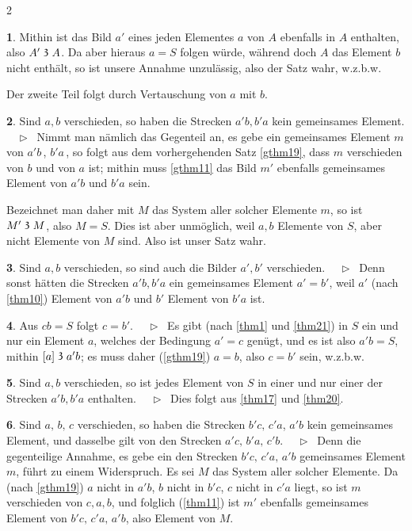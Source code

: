 \documentclass[leqno,hidelinks,10pt]{article}
\theoremstyle{definition}
\newtheorem{satz}{\protect\satzname}
\newcommand{\satzname}{}
\renewcommand{\satzname}{\hspace{-4pt}.\ Satz}%
\renewcommand{\satzname}{\hspace{-4pt}.\ Theorem}%
\newcommand\Beweis{\medskip \newline $ \phantom{'.'} \rhd \ $}%
\newcommand\TeilVon{\mathrel{\raisebox{0.45ex}{$\mathfrak{3}$}}}
\newcommand{\sref}[1]{\underline{\ref{#1}}}%
\begin{document}
\begin{paracol}{2}
\begin{leftcolumn}
\begin{satz}
Mithin ist das Bild $a'$ eines jeden Elementes $a$ von $A$ ebenfalls in $A$
enthalten, also $A' \TeilVon A$. Da aber hieraus $a = S$ folgen würde, während
doch $A$ das Element $b$ nicht enthält, so ist unsere Annahme unzulässig, also
der Satz wahr, w.z.b.w.

Der zweite Teil folgt durch Vertauschung von $a$ mit $b$.%
\end{satz}

\begin{satz}\label{gthm20}
Sind $a, b$ verschieden, so haben die Strecken $a'b, b'a$ kein gemeinsames
Element.
\Beweis
Nimmt man nämlich das Gegenteil an, es gebe ein gemeinsames Element
$m\,$ von $a'b\,$, $b'a\,$, so folgt aus dem vorhergehenden Satz
\sref{gthm19}, dass $m$ verschieden von $b$ und von $a$ ist; mithin muss
\sref{gthm11} das Bild $m'$ ebenfalls gemeinsames Element von $a'b$ und $b'a$ sein.

Bezeichnet man daher mit $M$ das System aller solcher Elemente $m$, so ist
$M' \TeilVon M$, also $M = S$. Dies ist aber unmöglich, weil $a, b$ Elemente von
$S$, aber nicht Elemente von $M$ sind. Also ist unser Satz wahr.
\end{satz}

\begin{satz}\label{gthm21}
Sind $a, b$ verschieden, so sind auch die Bilder $a', b'$ verschieden.
\Beweis
Denn sonst hätten die Strecken $a'b, b'a$ ein gemeinsames Element $a' = b'$, weil
$a'$ (nach \sref{thm10}) Element von $a'b$ und $b'$ Element von $b'a$ ist.
\end{satz}

\begin{satz}\label{gthm22}
Aus $cb = S$ folgt $c = b'$.
\Beweis
Es gibt (nach \sref{thm1} und \sref{thm21}) in $S$ ein und nur ein Element $a$,
welches der Bedingung $a' = c$ genügt, und es ist also $a'b = S$, mithin
$[a] \TeilVon a'b$; es muss daher (\sref{gthm19}) $a = b$, also $c = b'$ sein, w.z.b.w.
\end{satz}

\begin{satz}\label{gthm23}
Sind $a, b$ verschieden, so ist jedes Element von $S$ in einer und nur einer
der Strecken $a'b, b'a$ enthalten.
\Beweis
Dies folgt aus \sref{thm17} und \sref{thm20}.
\end{satz}

\begin{satz}\label{gthm24}
Sind $a,\, b,\, c$ verschieden, so haben die Strecken $b'c,\, c'a$, $a'b$ kein
gemeinsames Element, und dasselbe gilt von den Strecken $a'c,\, b'a,\, c'b$.
\Beweis
Denn die gegenteilige Annahme, es gebe ein den Strecken $b'c,\, c'a,\, a'b$
gemeinsames Element $m$, führt zu einem Widerspruch. Es sei $M$ das System aller
solcher Elemente. Da (nach \sref{gthm19}) $a$ nicht in $a'b$, $ b$ nicht in
$b'c$, $c$ nicht in $c'a$ liegt, so ist $m$ verschieden von $c, a, b$, und folglich
(\sref{thm11}) ist $m'$ ebenfalls gemeinsames Element von $b'c,\, c'a,\, a'b$,
also Element von $M$.


\end{satz}
\end{leftcolumn}
\end{paracol}
\end{document}
